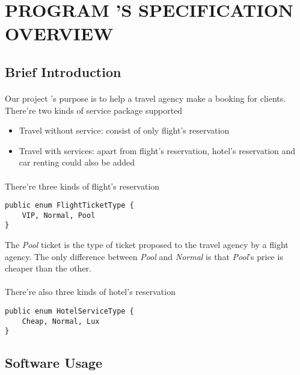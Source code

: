 \section{PROGRAM 'S SPECIFICATION OVERVIEW}

\subsection{Brief Introduction}

\paragraph{}
Our project 's purpose is to help a travel agency make a booking for clients. There're two kinds of service package supported

\begin{itemize}
\item Travel without service: consist of only flight's reservation
\item Travel with services: apart from flight's reservation, hotel's reservation and car renting could also be added
\end{itemize}

\paragraph{}
There're three kinds of flight's reservation

\begin{lstlisting}
public enum FlightTicketType {
	VIP, Normal, Pool
}
\end{lstlisting}
The \textit{Pool} ticket is the type of ticket proposed to the travel agency by a flight agency. The only difference between \textit{Pool} and \textit{Normal} is that \textit{Pool}'s price is cheaper than the other.

\paragraph{}
There're also three kinds of hotel's reservation

\begin{lstlisting}
public enum HotelServiceType {
	Cheap, Normal, Lux
}
\end{lstlisting}

\subsection{Software Usage}

